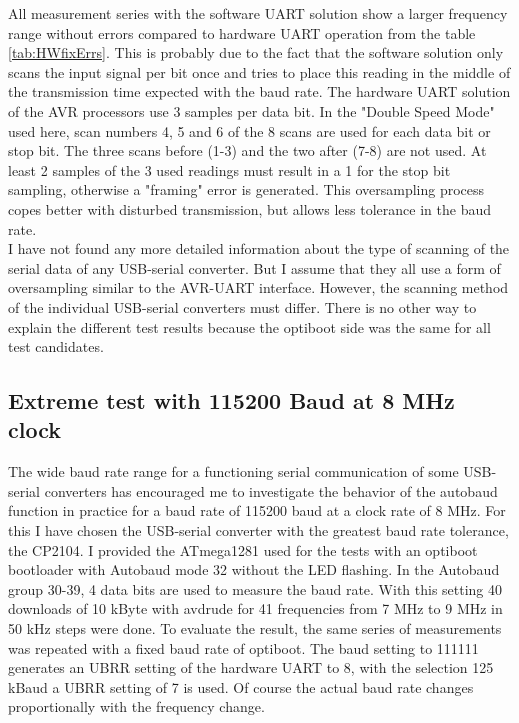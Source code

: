 All measurement series with the software UART solution show a larger frequency range without errors compared to hardware UART operation from the table \ref{tab:HWfixErrs}.
This is probably due to the fact that the software solution only scans the input signal per bit once and tries to place
this reading in the middle of the transmission time expected with the baud rate.
The hardware UART solution of the AVR processors use 3 samples per data bit.
In the "Double Speed Mode" used here, scan numbers 4, 5 and 6 of the 8 scans are used for each data bit or stop bit.
The three scans before (1-3) and the two after (7-8) are not used.
At least 2 samples of the 3 used readings must result in a 1 for the stop bit sampling, otherwise a "framing" error is generated.
This oversampling process copes better with disturbed transmission, but allows less tolerance in the baud rate.\\

I have not found any more detailed information about the type of scanning of the serial data of any USB-serial converter.
But I assume that they all use a form of oversampling similar to the AVR-UART interface.
However, the scanning method of the individual USB-serial converters must differ.
There is no other way to explain the different test results because the optiboot side was the same for all test candidates.

\subsection{Extreme test with 115200 Baud at 8 MHz clock}

The wide baud rate range for a functioning serial communication of some USB-serial converters has encouraged me
to investigate the behavior of the autobaud function in practice for a baud rate of 115200 baud at a clock rate of 8 MHz.
For this I have chosen the USB-serial converter with the greatest baud rate tolerance, the CP2104.
I provided the ATmega1281 used for the tests with an optiboot bootloader with Autobaud mode 32 without the LED flashing.
In the Autobaud group 30-39, 4 data bits are used to measure the baud rate.
With this setting 40 downloads of 10 kByte with avdrude for 41 frequencies from 7 MHz to 9 MHz in 50 kHz steps were done.
To evaluate the result, the same series of measurements was repeated with a fixed baud rate of optiboot.
The baud setting to 111111 generates an UBRR setting of the hardware UART to 8,
with the selection 125 kBaud a UBRR setting of 7 is used.
Of course the actual baud rate changes proportionally with the frequency change.

